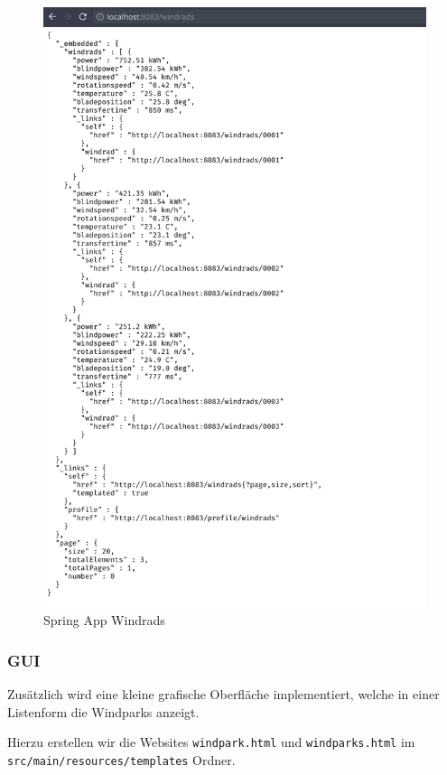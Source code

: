 \begin{figure}
    \caption{Spring App Windrads}
    \includegraphics[width=15cm]{images/spring-app-windrads}
    \centering
\end{figure}




\clearpage
\subsubsection{GUI}

Zusätzlich wird eine kleine grafische Oberfläche implementiert, welche in einer Listenform die Windparks anzeigt.

Hierzu erstellen wir die Websites \texttt{windpark.html} und \texttt{windparks.html} im \texttt{src/main/resources/templates} Ordner.

